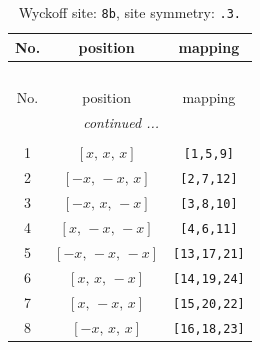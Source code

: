 \documentclass[fleqn,8pt]{jsarticle}
\begin{document}
\renewcommand{\arraystretch}{1.2}
\begin{longtable}{ccc}
\caption{Wyckoff site: {\tt 8b}, site symmetry: {\tt .3.}}
 \\
 \hline \hline
No. & position & mapping \\ \hline \endfirsthead

\multicolumn{2}{l}{\tablename\ \thetable{}} \\
 \hline \hline
No. & position & mapping \\ \hline \endhead

 \hline \hline
\multicolumn{2}{r}{\footnotesize\it continued ...} \\ \endfoot

 \hline \hline
\multicolumn{2}{r}{} \\ \endlastfoot

1 & $\left[ x,\, x,\, x \right]$ & {\tt [1,5,9]} \\ \hline
2 & $\left[ - x,\, - x,\, x \right]$ & {\tt [2,7,12]} \\ \hline
3 & $\left[ - x,\, x,\, - x \right]$ & {\tt [3,8,10]} \\ \hline
4 & $\left[ x,\, - x,\, - x \right]$ & {\tt [4,6,11]} \\ \hline
5 & $\left[ - x,\, - x,\, - x \right]$ & {\tt [13,17,21]} \\ \hline
6 & $\left[ x,\, x,\, - x \right]$ & {\tt [14,19,24]} \\ \hline
7 & $\left[ x,\, - x,\, x \right]$ & {\tt [15,20,22]} \\ \hline
8 & $\left[ - x,\, x,\, x \right]$ & {\tt [16,18,23]} \\
\end{longtable}
\renewcommand{\arraystretch}{1.2}
\end{document}
